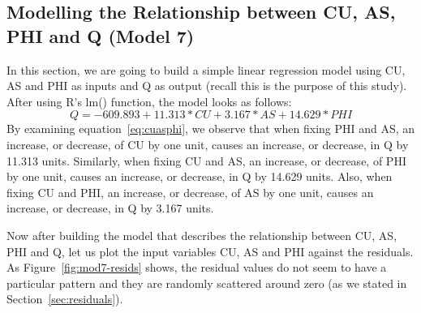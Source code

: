 \documentclass[a4paper,12pt, english]{article}
\begin{document}
\subsection{Modelling the Relationship between CU, AS, PHI and Q (Model 7)} \label{sec:cuasphimodel}
In this section, we are going to build a simple linear regression model using CU, AS and PHI as inputs and Q as output (recall this is the purpose of this study). After using R's lm() function, the model looks as follows:\\
\begin{equation}
\label{eq:cuasphi}
Q = -609.893  +     11.313*CU    +    3.167*AS   +    14.629*PHI
\end{equation}       
By examining equation~\ref{eq:cuasphi}, we observe that when fixing PHI and AS, an increase, or decrease, of CU by one unit, causes an increase, or decrease, in Q by 11.313 units.
Similarly, when fixing CU and AS, an increase, or decrease, of PHI by one unit, causes an increase, or decrease, in Q by 14.629 units. Also, when fixing CU and PHI, an increase, or decrease, of AS by one unit, causes an increase, or decrease, in Q by 3.167 units.

Now after building the model that describes the relationship between CU, AS, PHI and Q, let us plot the input variables CU, AS and PHI against the residuals. As Figure~\ref{fig:mod7-resids} shows, the residual values do not seem to have a particular pattern and they are randomly scattered around zero (as we stated in Section~\ref{sec:residuals}).
\end{document}
